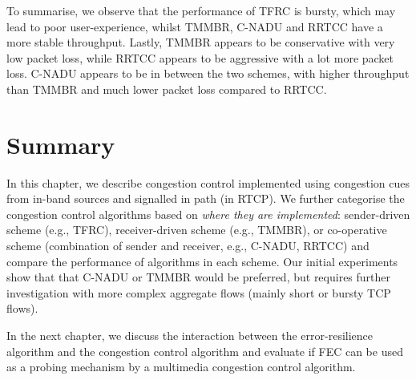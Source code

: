To summarise, we observe that the performance of TFRC is bursty, which may
lead to poor user-experience, whilst TMMBR, C-NADU and RRTCC have a more
stable throughput. Lastly, TMMBR appears to be conservative with very low
packet loss, while RRTCC appears to be aggressive with a lot more packet loss.
C-NADU appears to be in between the two schemes, with higher throughput than
TMMBR and much lower packet loss compared to RRTCC. 

\section{Summary}

In this chapter, we describe congestion control implemented using congestion
cues from in-band sources and signalled in path (in RTCP). We further
categorise the congestion control algorithms based on \emph{where they are
implemented}: sender-driven scheme (e.g., TFRC), receiver-driven scheme (e.g.,
TMMBR), or co-operative scheme (combination of sender and receiver, e.g.,
C-NADU, RRTCC) and compare the performance of algorithms in each scheme. Our
initial experiments show that that C-NADU or TMMBR would be preferred, but
requires further investigation with more complex aggregate flows (mainly short
or bursty TCP flows).

In the next chapter, we discuss the interaction between the error-resilience
algorithm and the congestion control algorithm and evaluate if FEC can be used
as a probing mechanism by a multimedia congestion control algorithm.
